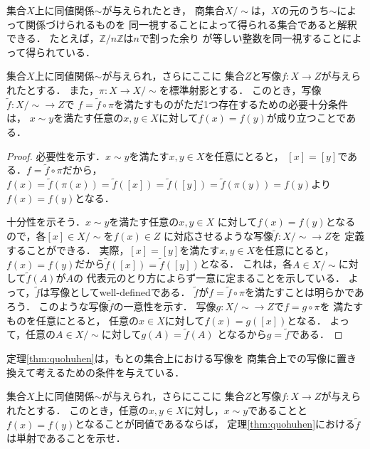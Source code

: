    集合$X$上に同値関係$\sim$が与えられたとき，
   商集合$X/{\sim}$は，$X$の元のうち$\sim$によって関係づけられるものを
   同一視することによって得られる集合であると解釈できる．
   たとえば，$\mathbb{Z} / { n \mathbb{Z}}$は$n$で割った余り
   が等しい整数を同一視することによって得られている．

   \begin{thm}[商集合の普遍性] \label{thm:quohuhen}
     集合$X$上に同値関係$\sim$が与えられ，さらにここに
     集合$Z$と写像$f:X \longrightarrow Z$が与えられたとする．
     また，$\pi : X \longrightarrow X/{\sim}$を標準射影とする．
     このとき，写像$\tilde{f} : X/{\sim} \longrightarrow Z$で
     $f= \tilde{f} \circ \pi$を満たすものがただ1つ存在するための必要十分条件は，
     $x \sim y$を満たす任意の$x,y \in X$に対して$f(x)=f(y)$が成り立つことである．
   \end{thm}

   \begin{proof}
     必要性を示す．$x \sim y$を満たす$x,y \in X$を任意にとると，
     $[x]= [y]$である．$f= \tilde{f} \circ \pi$だから，
     $f(x) = \tilde{f} (\pi (x) ) = \tilde{f} ( [x] ) = \tilde{f} ([y])
     = \tilde{f} ( \pi(y) ) = f(y) $より$f(x) = f(y)$となる．

     十分性を示そう．$x \sim y$を満たす任意の$x,y \in X$
     に対して$f(x) = f(y)$となるので，各$[x] \in X/{\sim}$を$f(x) \in Z$
     に対応させるような写像$\tilde{f} : X/{\sim} \longrightarrow Z$を
     定義することができる．
     実際，$[x] = [y]$を満たす$x,y \in X$を任意にとると，
     $f(x)=f(y)$だから$\tilde{f} ([x]) = \tilde{f} ( [y])$となる．
     これは，各$A \in X/{\sim}$に対して$\tilde{f}(A)$が$A$の
     代表元のとり方によらず一意に定まることを示している．
     よって，$\tilde{f}$は写像としてwell-definedである．
     $\tilde{f}$が$f= \tilde{f} \circ \pi$を満たすことは明らかであろう．
     このような写像$\tilde{f}$の一意性を示す．
     写像$g: X/{\sim} \longrightarrow Z$で$f= g \circ \pi$を
     満たすものを任意にとると，
     任意の$x \in X$に対して$f(x) = g([x])$となる．
     よって，任意の$A \in X/{\sim}$に対して$g(A) = \tilde{f} (A)$
     となるから$g= \tilde{f}$である．
   \end{proof}

   定理\ref{thm:quohuhen}は，もとの集合上における写像を
   商集合上での写像に置き換えて考えるための条件を与えている．

   \begin{que} \label{que:quohuhen}
     集合$X$上に同値関係$\sim$が与えられ，さらにここに
     集合$Z$と写像$f: X \longrightarrow Z$が与えられたとする．
     このとき，任意の$x,y \in X$に対し，$x \sim y $であることと
     $f(x)=f(y)$となることが同値であるならば，
     定理\ref{thm:quohuhen}における$\tilde{f}$は単射であることを示せ．
   \end{que}


